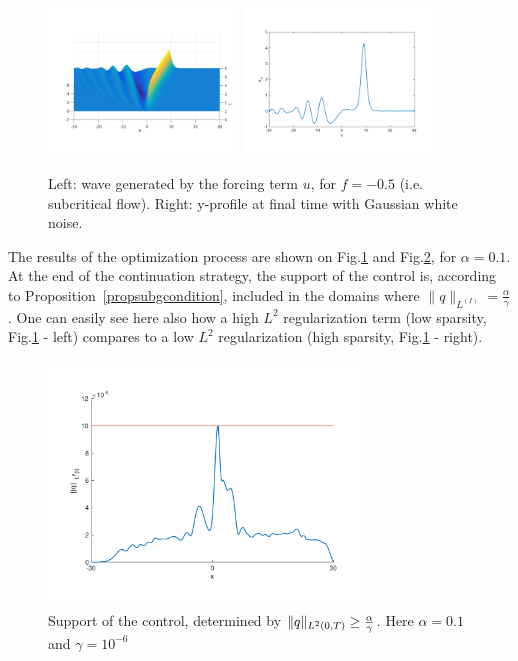 \begin{figure}[!h]
\includegraphics[width = 0.45\textwidth]{images/ex1yd3D.pdf}
\includegraphics[width = 0.45\textwidth]{images/ex1yd.pdf}
\caption{Left: wave generated by the forcing term $u$, for $f = -0.5$ (i.e. subcritical flow). Right: y-profile at final time with Gaussian white noise.}
\label{supportcontrol1}
\end{figure}

The results  of the optimization process are shown on Fig.\ref{supportcontrol1} and Fig.\ref{reconstruction}, for $\alpha = 0.1$. At the end of the continuation strategy, the support of the control is, according to Proposition~\ref{propsubgcondition}, included in the domains where $\|q\|_{L^(I)} = \frac{\alpha}{\gamma}$. One can easily see here also how a high $L^2$ regularization term (low sparsity, Fig.\ref{supportcontrol1} - left) compares to a low $L^2$ regularization (high sparsity, Fig.\ref{supportcontrol1} - right).
\begin{figure}[!h]
\includegraphics[width = 0.75\textwidth]{images/ex1_bis_qdm6.pdf}
\caption{Support of the control, determined by $\lVert q\rVert_{L^2(0,T)}\geq \frac{\alpha}{\gamma}$. Here $\alpha = 0.1$ and $\gamma = 10^{-6}$}
\label{reconstruction}
\end{figure}

